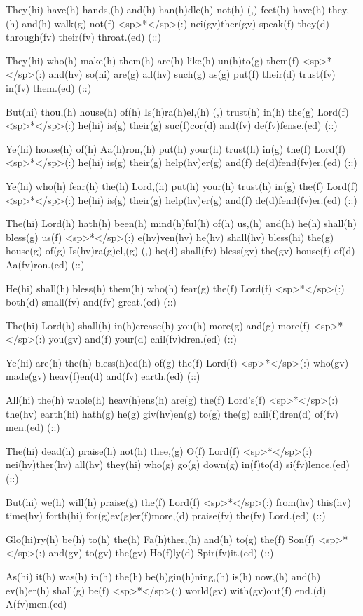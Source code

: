 They(hi) have(h) hands,(h) and(h) han(h)dle(h) not(h) (,) feet(h) have(h) they,(h) and(h) walk(g) not(f) <sp>*</sp>(:) nei(gv)ther(gv) speak(f) they(d) through(fv) their(fv) throat.(ed) (::)

They(hi) who(h) make(h) them(h) are(h) like(h) un(h)to(g) them(f) <sp>*</sp>(:) and(hv) so(hi) are(g) all(hv) such(g) as(g) put(f) their(d) trust(fv) in(fv) them.(ed) (::)

But(hi) thou,(h) house(h) of(h) Is(h)ra(h)el,(h) (,) trust(h) in(h) the(g) Lord(f) <sp>*</sp>(:) he(hi) is(g) their(g) suc(f)cor(d) and(fv) de(fv)fense.(ed) (::)

Ye(hi) house(h) of(h) Aa(h)ron,(h) put(h) your(h) trust(h) in(g) the(f) Lord(f) <sp>*</sp>(:) he(hi) is(g) their(g) help(hv)er(g) and(f) de(d)fend(fv)er.(ed) (::)

Ye(hi) who(h) fear(h) the(h) Lord,(h) put(h) your(h) trust(h) in(g) the(f) Lord(f) <sp>*</sp>(:) he(hi) is(g) their(g) help(hv)er(g) and(f) de(d)fend(fv)er.(ed) (::)

The(hi) Lord(h) hath(h) been(h) mind(h)ful(h) of(h) us,(h) and(h) he(h) shall(h) bless(g) us(f) <sp>*</sp>(:) e(hv)ven(hv) he(hv) shall(hv) bless(hi) the(g) house(g) of(g) Is(hv)ra(g)el,(g) (,) he(d) shall(fv) bless(gv) the(gv) house(f) of(d) Aa(fv)ron.(ed) (::)

He(hi) shall(h) bless(h) them(h) who(h) fear(g) the(f) Lord(f) <sp>*</sp>(:)  both(d) small(fv) and(fv) great.(ed) (::)

The(hi) Lord(h) shall(h) in(h)crease(h) you(h) more(g) and(g) more(f) <sp>*</sp>(:) you(gv) and(f) your(d) chil(fv)dren.(ed) (::)

Ye(hi) are(h) the(h) bless(h)ed(h) of(g) the(f) Lord(f) <sp>*</sp>(:) who(gv) made(gv) heav(f)en(d) and(fv) earth.(ed) (::)

All(hi) the(h) whole(h) heav(h)ens(h) are(g) the(f) Lord's(f) <sp>*</sp>(:) the(hv) earth(hi) hath(g) he(g) giv(hv)en(g) to(g) the(g) chil(f)dren(d) of(fv) men.(ed) (::)

The(hi) dead(h) praise(h) not(h) thee,(g) O(f) Lord(f) <sp>*</sp>(:) nei(hv)ther(hv) all(hv) they(hi) who(g) go(g) down(g) in(f)to(d) si(fv)lence.(ed) (::)

But(hi) we(h) will(h) praise(g) the(f) Lord(f) <sp>*</sp>(:) from(hv) this(hv) time(hv) forth(hi) for(g)ev(g)er(f)more,(d) praise(fv) the(fv) Lord.(ed) (::)

Glo(hi)ry(h) be(h) to(h) the(h) Fa(h)ther,(h) and(h) to(g) the(f) Son(f) <sp>*</sp>(:) and(gv) to(gv) the(gv) Ho(f)ly(d) Spir(fv)it.(ed) (::)

As(hi) it(h) was(h) in(h) the(h) be(h)gin(h)ning,(h) is(h) now,(h) and(h) ev(h)er(h) shall(g) be(f) <sp>*</sp>(:) world(gv) with(gv)out(f) end.(d) A(fv)men.(ed)
